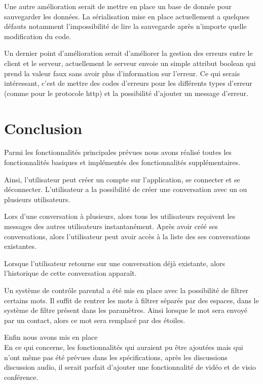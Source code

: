 \par Une autre amélioration serait de mettre en place un base de donnée pour sauvegarder les données. La sérialisation mise en place actuellement a quelques défauts notamment l'impossibilité de lire la sauvegarde après n'importe quelle modification du code.

\par Un dernier point d’amélioration serait d’améliorer la gestion des erreurs entre le client et le serveur, actuellement le serveur envoie un simple attribut boolean qui prend la valeur faux sans avoir plus d'information sur l'erreur. Ce qui serais intéressant, c'est de mettre des codes d'erreurs pour les différents types d'erreur (comme pour le protocole http) et la possibilité d'ajouter un message d'erreur.

\newpage
\part{Conclusion}

\par Parmi les fonctionnalités principales prévues nous avons réalisé toutes les fonctionnalités basiques et implémentés des fonctionnalités supplémentaires. \\

\par Ainsi, l'utilisateur peut créer un compte sur l'application, se connecter et se déconnecter. L'utilisateur a la possibilité de créer une conversation avec un ou plusieurs utilisateurs. 
\par Lors d'une conversation à plusieurs, alors tous les utilisateurs reçoivent les messages des autres utilisateurs instantanément. Après avoir créé ses conversations, alors l'utilisateur peut avoir accès à la liste des ses conversations existantes.
\par Lorsque l'utilisateur retourne sur une conversation déjà existante, alors l'historique de cette conversation apparaît.
\par Un système de contrôle parental a été mis en place avec la possibilité de filtrer certains mots. Il suffit de rentrer les mots à filtrer séparés par des espaces, dans le système de filtre présent dans les paramètres. Ainsi lorsque le mot sera envoyé par un contact, alors ce mot sera remplacé par des étoiles.
\par Enfin nous avons mis en place \\



En ce qui concerne, les fonctionnalités qui auraient pu être ajoutées mais qui n’ont même pas été prévues dans les spécifications, après les discussions discussion audio, il serait parfait d'ajouter une fonctionnalité de vidéo et de visio conférence. 